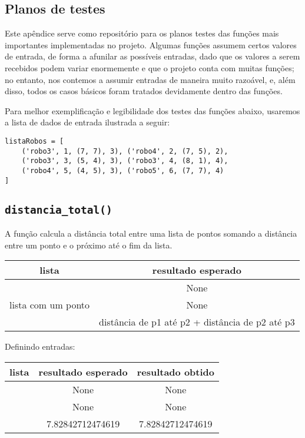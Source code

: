 \begin{apendicesenv}

\chapter{Planos de testes}\label{apendiceA}

Este apêndice serve como repositório para os planos testes das funções mais importantes implementadas no projeto. Algumas funções assumem certos valores de entrada, de forma a afunilar as possíveis entradas, dado que os valores a serem recebidos podem variar enormemente e que o projeto conta com muitas funções; no entanto, nos contemos a assumir entradas de maneira muito razoável, e, além disso, todos os casos básicos foram tratados devidamente dentro das funções.


Para melhor exemplificação e legibilidade dos testes das funções abaixo, usaremos a lista de dados de entrada ilustrada a seguir:

\begin{lstlisting}
listaRobos = [
    ('robo3', 1, (7, 7), 3), ('robo4', 2, (7, 5), 2),
    ('robo3', 3, (5, 4), 3), ('robo3', 4, (8, 1), 4),
    ('robo4', 5, (4, 5), 3), ('robo5', 6, (7, 7), 4)
]
\end{lstlisting}

\section{\texttt{distancia\_total()}}
A função calcula a distância total entre uma lista de pontos somando a distância entre um ponto e o próximo até o fim da lista.

\begin{center}
    \begin{tabular}{|c|c|}
        \cline{1-2}
        lista & resultado esperado \\ \hline
        [] & None \\ \hline  
        lista com um ponto & None \\ \hline  
        [p1, p2, p3] & distância de p1 até p2 + distância de p2 até p3 \\ \hline
    \end{tabular}
\end{center}

Definindo entradas:

\begin{center}
    \begin{tabular}{|c|c|c|}
        \cline{1-3}
        lista & resultado esperado & resultado obtido  \\ \hline
        [] & None & None \\ \hline
        [(4,4)] & None & None \\ \hline
        [(0,0),(3,4),(5,6)] & 7.82842712474619 & 7.82842712474619 \\ \hline


\end{tabular}
\end{center}
\end{apendicesenv}
